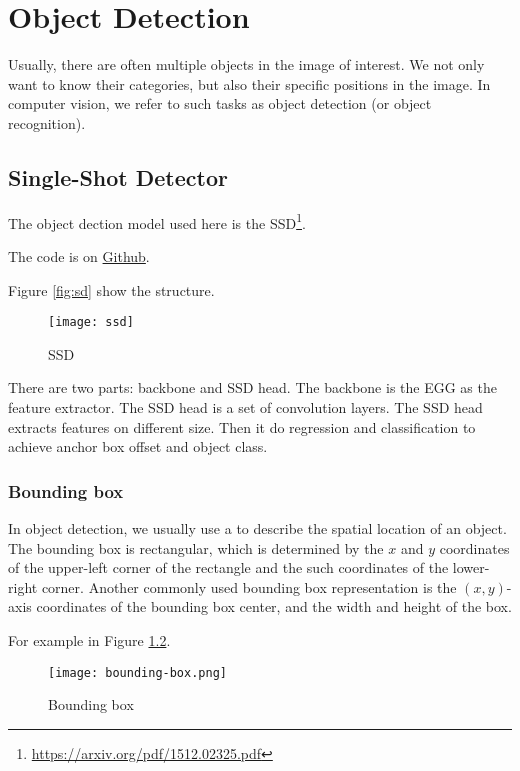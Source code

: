 
\chapter{Object Detection}

Usually, there are often multiple objects in the image of interest.
We not only want to know their categories, but also their specific positions in the image.
In computer vision, we refer to such tasks as object detection (or object recognition).


\section{Single-Shot Detector}
\label{sec:single-shot-detector}



The object dection model used here is the SSD\footnote{\url{https://arxiv.org/pdf/1512.02325.pdf}}.

The code is on \href{https://github.com/mingmingli916/object_detection_pytorch}{Github}.


Figure \ref{fig:sd} show the structure.
\begin{figure}[!htbp]
  \centering
  \texttt{[image: ssd]}
  \caption{SSD}
  \label{fig:ssd}
\end{figure}

There are two parts: backbone and SSD head.
The backbone is the EGG as the feature extractor.
The SSD head is a set of convolution layers.
The SSD head extracts features on different size.
Then it do regression and classification to achieve anchor box offset and object class.

\subsection{Bounding box}
\label{sec:bounding-box}


In object detection, we usually use a  to describe the spatial location of an object.
The bounding box is rectangular, which is determined by the $x$ and $y$ coordinates of the upper-left corner of the rectangle and the such coordinates of the lower-right corner.
Another commonly used bounding box representation is the $(x, y)$-axis coordinates of the bounding box center, and the width and height of the box.

For example in Figure \ref{fig:bounding-box}.
\begin{figure}[!ht]
  \centering
  \texttt{[image: bounding-box.png]}
  \caption{Bounding box}
  \label{fig:bounding-box}
\end{figure}



